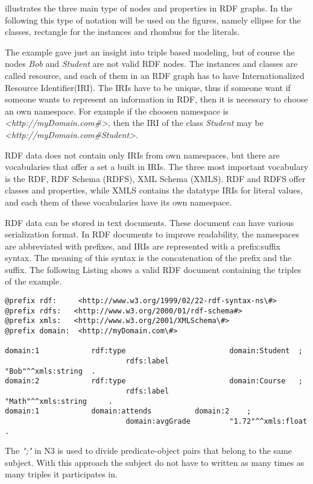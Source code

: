  illustrates the three main type of nodes and properties in RDF graphs. In the following this type of notation will be used on the figures, namely ellipse for the classes, rectangle for the instances and rhombus for the literals.


The example gave just an insight into triple based modeling, but of course the nodes \textit{Bob} and \textit{Student} are not valid RDF nodes. The instances and classes are called resource, and each of them in an RDF graph has to have Internationalized Resource Identifier(IRI). The IRIs have to be unique, thus if someone want if someone wants to represent an information in RDF, then it is necessary to choose an own namespace. For example if the choosen namespace is \textit{<http://myDomain.com\#>}, then the IRI of the class \textit{Student} may be \textit{<http://myDomain.com\#Student>}.


RDF data does not contain only IRIs from own namespaces, but there are vocabularies that offer a set a built in IRIs. The three most important vocabulary is the RDF, RDF Schema (RDFS), XML Schema (XMLS).  RDF and RDFS offer classes and properties, while XMLS contains the datatype IRIs for literal values, and each them of these vocabularies have its own namespace.

RDF data can be stored in text documents. These document can have various serialization format. In RDF documents to improve readability, the namespaces are abbreviated with prefixes, and IRIs are represented with a prefix:suffix syntax. The meaning of this syntax is the concatenation of the prefix and the suffix. The following Listing shows a valid RDF document containing the triples of the example.

\begin{lstlisting}[basicstyle=\footnotesize, captionpos=b, caption=RDF data in N3 serialization format, label=lst:sparql,
frame=single]
@prefix rdf:  	 <http://www.w3.org/1999/02/22-rdf-syntax-ns\#>
@prefix rdfs:   <http://www.w3.org/2000/01/rdf-schema#>
@prefix xmls:  	<http://www.w3.org/2001/XMLSchema\#>
@prefix domain:  <http://myDomain.com\#>

domain:1			rdf:type						domain:Student 	;
							rdfs:label					"Bob"^^xmls:string 	.
domain:2			rdf:type						domain:Course 	;
							rdfs:label					"Math"^^xmls:string 	.
domain:1			domain:attends			domain:2 	;
							domain:avgGrade			"1.72"^^xmls:float .
\end{lstlisting}

The \textit{";"} in N3 is used to divide predicate-object pairs that belong to the same subject. With this approach the subject do not have to written as many times as many triples it participates in.

